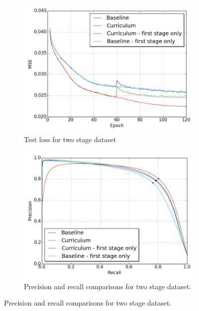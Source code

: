\begin{figure}
\begin{subfigure}{0.5\textwidth}
\includegraphics[width=\linewidth]{figs/E6/E6_lc_two_stage.png}

\caption{Test loss for two stage dataset}
\vspace{0.4cm} 
\label{fig:E6_curriculum_inexperienced_loss}
\end{subfigure}
\hspace*{\fill} %
\begin{subfigure}{0.5\textwidth}
\includegraphics[width=\linewidth]{figs/E6/E6_pr_two_stage.png}
\caption{Precision and recall comparisons for two stage dataset.} \label{fig:E6_curriculum_inexperienced_pr}
\end{subfigure}


\end{figure}
